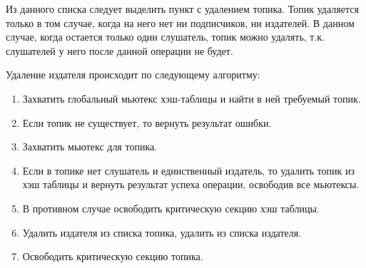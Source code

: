Из данного списка следует выделить пункт с удалением топика. Топик удаляется только в том случае, когда на него нет ни подписчиков, ни издателей. В данном случае, когда остается только один слушатель, топик можно удалять, т.к. слушателей у него после данной операции не будет.

Удаление издателя происходит по следующему алгоритму:

\begin{enumerate}
	\item Захватить глобальный мьютекс хэш-таблицы и найти в ней требуемый топик.
	\item Если топик не существует, то вернуть результат ошибки.
	\item Захватить мьютекс для топика.
	\item Если в топике нет слушатель и единственный издатель, то удалить топик из хэш таблицы и вернуть результат успеха операции, освободив все мьютексы.
	\item В противном случае освободить критическую секцию хэш таблицы.
	\item Удалить издателя из списка топика, удалить из списка издателя.
	\item Освободить критическую секцию топика.
\end{enumerate} 

